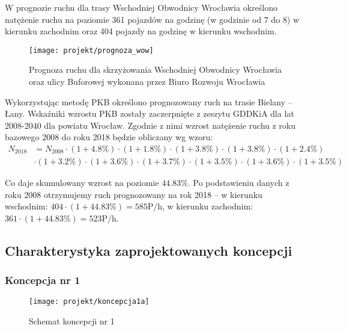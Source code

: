 \documentclass[twoside,12pt]{article}
\begin{document}
	W prognozie ruchu dla trasy Wschodniej Obwodnicy Wrocławia określono natężenie ruchu na poziomie 361 pojazdów na godzinę (w godzinie od 7 do 8) w kierunku zachodnim oraz 404 pojazdy na godzinę w kierunku wschodnim. 
	
	\begin{figure}[H]
	\centering
	\texttt{[image: projekt/prognoza\_wow]}
	\caption{Prognoza ruchu dla skrzyżowania Wschodniej Obwodnicy Wrocławia oraz ulicy Buforowej wykonana przez Biuro Rozwoju Wrocławia}
	
	\end{figure}
	
	Wykorzystując metodę PKB określono prognozowany ruch na trasie Bielany -- Łany. Wskaźniki wzrostu PKB zostały zaczerpnięte z zeszytu GDDKiA dla lat 2008-2040 dla powiatu Wrocław. Zgodnie z nimi wzrost natężenie ruchu z roku bazowego 2008 do roku 2018 będzie obliczany wg wzoru:
	\begin{align*}
	N_{\text{2018}}&=N_{\text{2008}} \cdot (1+4.8\%) \cdot (1+1.8\%) \cdot (1+3.8\%) \cdot (1+3.8\%) \cdot (1+2.4\%) \\
	&\cdot (1+3.2\%) 	\cdot (1+3.6\%) \cdot (1+3.7\%) \cdot (1+3.5\%) \cdot (1+3.6\%) \cdot (1+3.5\%)
	\end{align*}
	
	Co daje skumulowany wzrost na poziomie $44.83\%$. Po podstawieniu danych z roku 2008 otrzymujemy ruch prognozowany na rok 2018 -- w kierunku wschodnim: $404 \cdot (1+44.83\%) = 585 \text{P/h}$, w kierunku zachodnim: $361 \cdot (1+44.83\%) = 523 \text{P/h}$.
	
	\subsection{Charakterystyka zaprojektowanych koncepcji}
	
	\subsubsection{Koncepcja nr 1}
	
		\begin{figure}[H]
		\centering
		\texttt{[image: projekt/koncepcja1a]}
		\caption{Schemat koncepcji nr 1}
		
		\end{figure}
		
\end{document}
